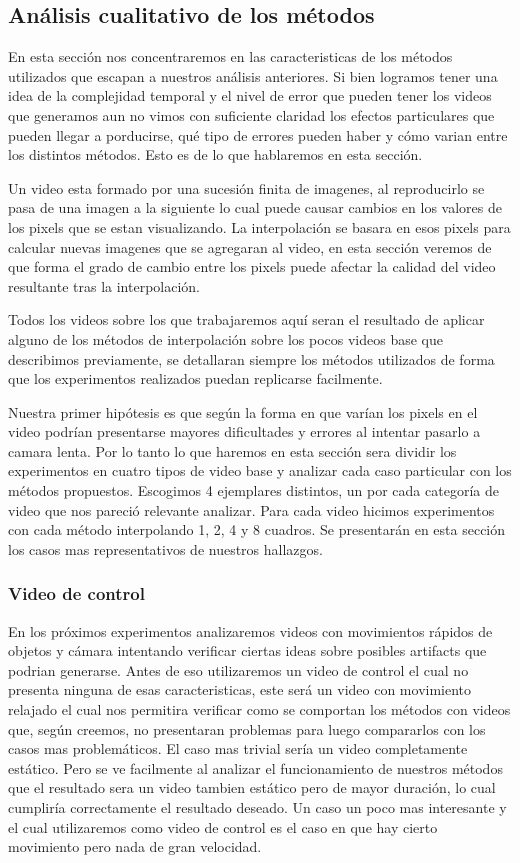 \subsection{Análisis cualitativo de los métodos}

En esta sección nos concentraremos en las caracteristicas de los métodos utilizados que escapan a nuestros análisis anteriores. Si bien logramos tener una idea de la complejidad temporal y el nivel de error que pueden tener los videos que generamos aun no vimos con suficiente claridad los efectos particulares que pueden llegar a porducirse, qué tipo de errores pueden haber y cómo varian entre los distintos métodos. Esto es de lo que hablaremos en esta sección.

Un video esta formado por una sucesión finita de imagenes, al reproducirlo se pasa de una imagen a la siguiente lo cual puede causar cambios en los valores de los pixels que se estan visualizando. La interpolación se basara en esos pixels para calcular nuevas imagenes que se agregaran al video, en esta sección veremos de que forma el grado de cambio entre los pixels puede afectar la calidad del video resultante tras la interpolación.

Todos los videos sobre los que trabajaremos aquí seran el resultado de aplicar alguno de los métodos de interpolación sobre los pocos videos base que describimos previamente, se detallaran siempre los métodos utilizados de forma que los experimentos realizados puedan replicarse facilmente.

Nuestra primer hipótesis es que según la forma en que varían los pixels en el video podrían presentarse mayores dificultades y errores al intentar pasarlo a camara lenta. Por lo tanto lo que haremos en esta sección sera dividir los experimentos en cuatro tipos de video base y analizar cada caso particular con los métodos propuestos. Escogimos 4 ejemplares distintos, un por cada categoría de video que nos pareció relevante analizar. Para cada video hicimos experimentos con cada método interpolando 1, 2, 4 y 8 cuadros. Se presentarán en esta sección los casos mas representativos de nuestros hallazgos.

\subsubsection{Video de control}

En los próximos experimentos analizaremos videos con movimientos rápidos de objetos y cámara intentando verificar ciertas ideas sobre posibles artifacts que podrian generarse. Antes de eso utilizaremos un video de control el cual no presenta ninguna de esas caracteristicas, este será un video con movimiento relajado el cual nos permitira verificar como se comportan los métodos con videos que, según creemos, no presentaran problemas para luego compararlos con los casos mas problemáticos. El caso mas trivial sería un video completamente estático. Pero se ve facilmente al analizar el funcionamiento de nuestros métodos que el resultado sera un video tambien estático pero de mayor duración, lo cual cumpliría correctamente el resultado deseado. Un caso un poco mas interesante y el cual utilizaremos como video de control es el caso en que hay cierto movimiento pero nada de gran velocidad.

